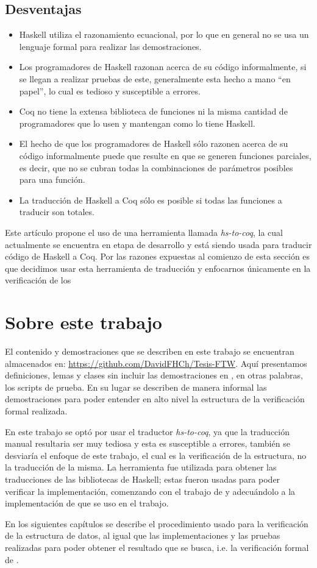 \subsection{Desventajas}
\begin{itemize}
    \item Haskell utiliza el razonamiento ecuacional, por lo que en general no se usa un lenguaje formal para realizar las demostraciones.
    \item Los programadores de Haskell razonan acerca de su código informalmente, si se llegan a
    realizar pruebas de este, generalmente esta hecho a mano ``en papel'', lo cual es tedioso y
    susceptible a errores.
    \item Coq no tiene la extensa biblioteca de funciones ni la misma cantidad de programadores
    que lo usen y mantengan como lo tiene Haskell.
    \item El hecho de que los programadores de Haskell s\'olo razonen acerca de su código
    informalmente puede que resulte en que se generen funciones parciales, es decir, que no se
    cubran todas la combinaciones de parámetros posibles para una funci\'on.
    \item La traducci\'on de Haskell a Coq s\'olo es posible si todas las funciones a traducir son
    totales.
\end{itemize}

Este art\'iculo propone el uso de una herramienta llamada \textit{hs-to-coq}, la cual actualmente se
encuentra en etapa de desarrollo y est\'a siendo usada para traducir código de Haskell a Coq. Por las razones expuestas al comienzo de esta secci\'on es que decidimos usar esta herramienta de traducci\'on y enfocarnos \'unicamente en la verificaci\'on de los \arns

\section{Sobre este trabajo}
El contenido y demostraciones que se describen en este trabajo se encuentran almacenados en:
\url{https://github.com/DavidFHCh/Tesis-FTW}. Aqu\'i presentamos definiciones, lemas y clases sin
incluir las demostraciones en {\coq}, en otras palabras, los scripts de prueba. En su lugar se describen de manera informal las demostraciones para poder entender en alto nivel la estructura de la verificaci\'on formal realizada.

En este trabajo se opt\'o por usar el traductor \textit{hs-to-coq}, ya que la traducci\'on manual
resultaria ser muy tediosa y esta es susceptible a errores, tambi\'en se desviaría el enfoque de
este trabajo, el cual es la verificaci\'on de la estructura, no la traducci\'on de la misma. La
herramienta fue utilizada para obtener las traducciones de las bibliotecas de Haskell; estas fueron
usadas para poder verificar la implementación, comenzando con el trabajo de \cite{tesisG} y adecuándolo a la implementaci\'on de 
\cite{MSetRBT} que se uso en el trabajo.

En los siguientes capítulos se describe el procedimiento usado para la verificaci\'on de la
estructura de datos, al igual que las implementaciones y las pruebas realizadas para poder obtener
el resultado que se busca, i.e. la verificación formal de {\arns}.
